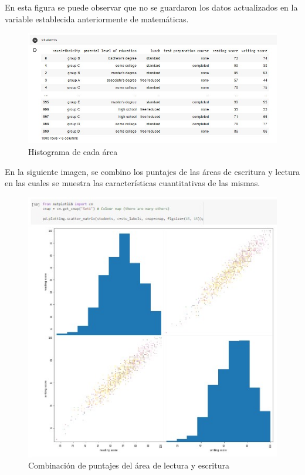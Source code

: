 \documentclass[conference,compsoc,onecolumn]{IEEEtran}
\begin{document}
        En esta figura se puede observar que no se guardaron los datos actualizados en la variable establecida anteriormente de matemáticas. 
        \begin{figure}[H]       
            \centering
            \includegraphics[scale = 0.70]{md.jpg}
            \caption{Histograma de cada área}
            \label{subfigura16}
        \end{figure}
        
        En la siguiente imagen, se combino los puntajes de las áreas de escritura y lectura en las cuales se muestra las características cuantitativas de las mismas.
        
         \begin{figure}[H]       
            \centering
            \includegraphics[scale = 0.70]{dd.jpg}
            \caption{Combinación de puntajes del área de lectura y escritura}
            \label{subfigura16}
        \end{figure}
        
\end{document}
